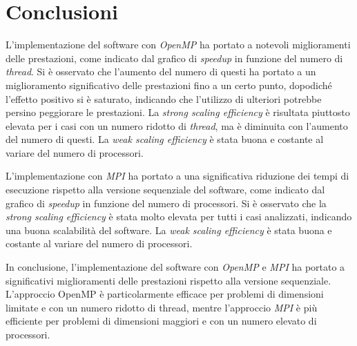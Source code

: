 \documentclass[a4paper, 12pt]{report}
\begin{document}
\chapter*{Conclusioni}
\begin{sloppypar}
  \noindent
  L'implementazione del software con \textit{OpenMP} ha portato a notevoli miglioramenti delle prestazioni, 
  come indicato dal grafico di \textit{speedup} in funzione del numero di \textit{thread}. Si è osservato che l'aumento 
  del numero di questi ha portato a un miglioramento significativo delle prestazioni fino a un certo punto, 
  dopodiché l'effetto positivo si è saturato, indicando che l'utilizzo di ulteriori potrebbe 
  persino peggiorare le prestazioni. La \textit{strong scaling efficiency} è risultata piuttosto elevata 
  per i casi con un numero ridotto di \textit{thread}, 
  ma è diminuita con l'aumento del numero di questi. La \textit{weak scaling efficiency} è stata buona e costante 
  al variare del numero di processori.

  \bigskip
  \noindent
  L'implementazione con \textit{MPI} ha portato a una significativa riduzione dei tempi di esecuzione rispetto 
  alla versione sequenziale del software, come indicato dal grafico di \textit{speedup} in funzione del numero di 
  processori. Si è osservato che la \textit{strong scaling efficiency} è stata molto elevata per tutti i casi analizzati, 
  indicando una buona scalabilità del software. La \textit{weak scaling efficiency} è stata buona e costante 
  al variare del numero di processori.

  \bigskip
  \noindent
  In conclusione, l'implementazione del software con \textit{OpenMP} e \textit{MPI} ha portato a significativi 
  miglioramenti delle prestazioni rispetto alla versione sequenziale. L'approccio OpenMP è 
  particolarmente efficace per problemi di dimensioni limitate e con un numero ridotto di thread, 
  mentre l'approccio \textit{MPI} è più efficiente per problemi di dimensioni maggiori e con 
  un numero elevato di processori.
\end{sloppypar}
  
\end{document}
